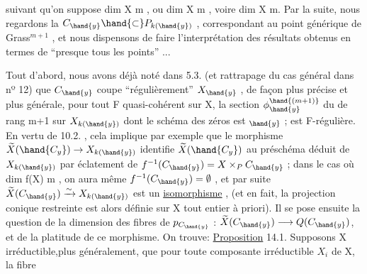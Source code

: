 
suivant qu'on suppose  dim X \hand{$\geqslant$} m , ou  dim X \hand{$\leqslant$} m , voire dim X \hand{$<$} m.
Par la suite, nous regardons la $C_{\hand{y}}\hand{\subset} P_{k(\hand{y})}$\hand{)} , correspondant au point
générique  de  Grass$^{m+1}$ , et nous dispensons  de faire l'interprétation
des résultats obtenus en termes de  ``presque tous les points'' ...

Tout d'abord, nous avons déjà noté dans 5.3. (et rattrapage du
cas général dans nº 12)  que $C_{\hand{y}}$  coupe ``régulièrement'' $X_{\hand{y}}$ , de façon
plus précise et plus générale, pour tout F quasi-cohérent sur X,
la section $\phi_{\hand{y}}^{\hand{(m+1)}}$ du  de rang  m+1  sur  $X_{k(\hand{y})}$  dont le
schéma des zéros est $_{\hand{y}}$ ; est F-régulière. En vertu de 10.2. , cela
implique par exemple que le morphisme  $\widetilde{X}(\hand{C_y})\to X_{k(\hand{y})}$ identifie $\widetilde{X}(\hand{C_y})$ au préschéma
déduit de $X_{k(\hand{y})}$ par éclatement de $f^{-1}(C_{\hand{y}})= X\times_P C_{\hand{y}}$ ;   dans le cas
où  dim f(X) \hand{$\leqslant$} m ,  on  aura même  $f^{-1}(C_{\hand{y}}) = \emptyset$ , et  par suite
$\widetilde{X}(C_{\hand{y}}) \xrightarrow{\sim} X_{k(\hand{y})}$  est un \uline{isomorphisme} , (et en fait, la \hand{\unsure{)}}projection conique
restreinte  est alors définie sur X tout entier à priori). Il se pose
ensuite la question de la dimension des fibres de $p_{C_{\hand{y}}}$ : $\widetilde{X}(C_{\hand{y}}) \longrightarrow Q(C_{\hand{y}})$,
et de la platitude de ce morphisme. On trouve:
\uline{Proposition} 14.1.   Supposons X irréductible,plus
généralement, que  pour toute composante irréductible $X_i$ de X, la fibre

